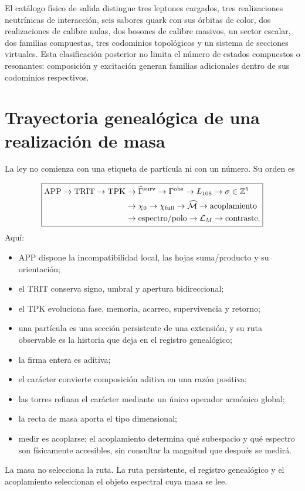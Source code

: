 El catálogo físico de salida distingue tres leptones cargados, tres realizaciones neutrínicas de interacción, seis sabores quark con sus órbitas de color, dos realizaciones de calibre nulas, dos bosones de calibre masivos, un sector escalar, dos familias compuestas, tres codominios topológicos y un sistema de secciones virtuales. Esta clasificación posterior no limita el número de estados compuestos o resonantes: composición y excitación generan familias adicionales dentro de sus codominios respectivos.

\section{Trayectoria genealógica de una realización de masa}
La ley no comienza con una etiqueta de partícula ni con un número. Su orden es

\[
\boxed{
\begin{aligned}
\mathrm{APP}\to\mathrm{TRIT}\to\mathrm{TPK}
&\to\widetilde\Gamma^{\rm surv}
\to\Gamma^{\rm obs}
\to L_{108}
\to\sigma\in\mathbb Z^5\\
&\to\chi_0
\to\chi_{\rm full}
\to\widehat{\mathcal M}
\to\text{acoplamiento}\\
&\to\text{espectro/polo}
\to\mathcal L_M
\to\text{contraste}.
\end{aligned}}
\]
Aquí:

\begin{itemize}
\item APP dispone la incompatibilidad local, las hojas suma/producto y su orientación;
\item el TRIT conserva signo, umbral y apertura bidireccional;
\item el TPK evoluciona fase, memoria, acarreo, supervivencia y retorno;
\item una partícula es una sección persistente de una extensión, y su ruta observable es
la historia que deja en el registro genealógico;

\item la firma entera es aditiva;
\item el carácter convierte composición aditiva en una razón positiva;
\item las torres refinan el carácter mediante un único operador armónico global;
\item la recta de masa aporta el tipo dimensional;
\item medir es acoplarse: el acoplamiento determina qué subespacio y qué espectro son
físicamente accesibles, sin consultar la magnitud que después se medirá.

\end{itemize}
La masa no selecciona la ruta. La ruta persistente, el registro genealógico y el acoplamiento seleccionan el objeto espectral cuya masa se lee.

